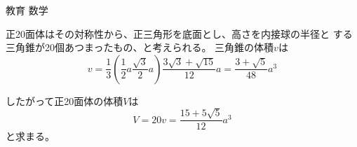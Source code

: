 \documentclass[fleqn]{jbook}
\begin{document}
\begin{answer}{教育 数学}{}
\begin{subanswers}
\begin{subsubanswers}
\SubSubAnswer
正20面体はその対称性から、正三角形を底面とし、高さを内接球の半径と
する三角錐が20個あつまったもの、と考えられる。
三角錐の体積$v$は
\[
 v=\frac{1}{3} \left( \frac{1}{2} a \frac{\sqrt{3}}{2} a \right)
 \frac{3\sqrt{3}+\sqrt{15}}{12} a 
  = \frac{3+\sqrt{5}}{48} a^3
\]

したがって正20面体の体積$V$は
\[ V=20v=\frac{15+5\sqrt{5}}{12}a^3 \]
と求まる。

\end{subsubanswers}
\end{subanswers}
\end{answer}
\end{document}
